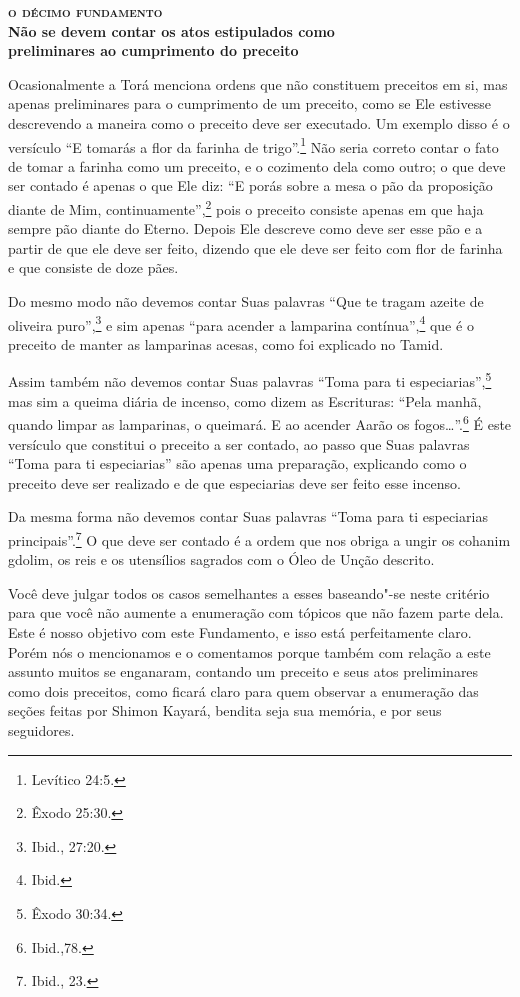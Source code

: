 \bigskip

\noindent\textbf{\textsc{o décimo fundamento}\\Não se devem contar os atos estipulados como\\ preliminares ao cumprimento do preceito}

\smallskip

Ocasionalmente a Torá\starr{} menciona ordens que não constituem preceitos em
si, mas apenas preliminares para o cumprimento de um preceito, como se
Ele estivesse descrevendo a maneira como o preceito deve ser executado.
Um exemplo disso é o versículo ``E tomarás a flor da farinha de trigo''.\footnote{Levítico 24:5.} Não seria correto contar o fato de tomar a farinha
como um preceito, e o cozimento dela como outro; o que deve ser contado
é apenas o que Ele diz: ``E porás sobre a mesa o pão da proposição
diante de Mim, continuamente'',\footnote{Êxodo 25:30.} pois o preceito consiste
apenas em que haja sempre pão diante do Eterno. Depois Ele descreve como
deve ser esse pão e a partir de que ele deve ser feito, dizendo que ele
deve ser feito com flor de farinha e que consiste de doze pães.

Do mesmo modo não devemos contar Suas palavras ``Que te tragam azeite de
oliveira puro'',\footnote{Ibid., 27:20.} e sim apenas ``para acender a lamparina
contínua'',\footnote{Ibid.} que é o preceito de manter as lamparinas acesas,
como foi explicado no Tamid\starr.

Assim também não devemos contar Suas palavras ``Toma para ti
especiarias'',\footnote{Êxodo 30:34.} mas sim a queima diária de incenso, como
dizem as Escrituras: ``Pela manhã, quando limpar as lamparinas, o
queimará. E ao acender Aarão os fogos\ldots{}''.\footnote{Ibid.,78.} É este versículo que constitui o
preceito a ser contado, ao passo que Suas palavras ``Toma para ti
especiarias'' são apenas uma preparação, explicando como o preceito deve
ser realizado e de que especiarias deve ser feito esse incenso.

Da mesma forma não devemos contar Suas palavras ``Toma para ti
especiarias principais''.\footnote{Ibid., 23.} O que deve ser contado é a ordem
que nos obriga a ungir os cohanim gdolim\starr, os reis e os utensílios
sagrados com o Óleo de Unção descrito.

Você deve julgar todos os casos semelhantes a esses baseando"-se neste
critério para que você não aumente a enumeração com tópicos que não
fazem parte dela. Este é nosso objetivo com este Fundamento, e isso está
perfeitamente claro. Porém nós o mencionamos e o comentamos porque
também com relação a este assunto muitos se enganaram, contando um
preceito e seus atos preliminares como dois preceitos, como ficará
claro para quem observar a enumeração das seções feitas por Shimon
Kayará, bendita seja sua memória, e por seus seguidores.

